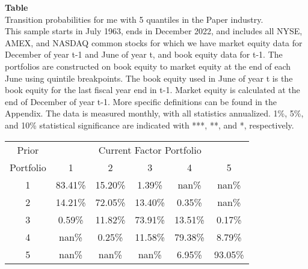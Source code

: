 \begin{table*}[ht!]
\raggedright
{}
\label{tab: transition_probs_me_Paper_with_5_quantiles}
\textbf{Table \thetable} \\
Transition probabilities for me with 5 quantiles in the Paper industry. \\
\hspace*{1em}This sample starts in July 1963, ends in December 2022, and includes all NYSE, AMEX, and NASDAQ common stocks for which we have market equity data for December of year t-1 and June of year t, and book equity data for t-1. The portfolios are constructed on book equity to market equity at the end of each June using quintile breakpoints.  The book equity used in June of year t is the book equity for the last fiscal year end in t-1.  Market equity is calculated at the end of December of year t-1.  More specific definitions can be found in the Appendix.  The data is measured monthly, with all statistics annualized.  1\%, 5\%, and 10\% statistical significance are indicated with ***, **, and *, respectively. \\
\vspace{0.5em}
\centering
\begin{adjustbox}{max width=\textwidth}
\begin{tabular}{@{}cccccc@{}}
\toprule
Prior & \multicolumn{5}{c}{Current Factor Portfolio} \\
Portfolio & 1 & 2 & 3 & 4 & 5 \\
\midrule
1 & 83.41\% & 15.20\% & 1.39\% & nan\% & nan\% \\
2 & 14.21\% & 72.05\% & 13.40\% & 0.35\% & nan\% \\
3 & 0.59\% & 11.82\% & 73.91\% & 13.51\% & 0.17\% \\
4 & nan\% & 0.25\% & 11.58\% & 79.38\% & 8.79\% \\
5 & nan\% & nan\% & nan\% & 6.95\% & 93.05\% \\
\bottomrule
\end{tabular}
\end{adjustbox}
\end{table*}